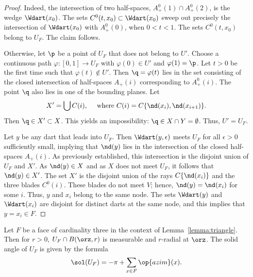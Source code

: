 \begin{proof} 
Indeed, the intersection of two half-spaces, $A^0_+(1)\cap
  A^0_+(2)$, is the wedge $\Wdart(x_0)$.  The sets
  $C^0(t,x_0)\subset\Wdart(x_0)$ sweep out precisely the intersection
  of $\Wdart(x_0)$ with $A^0_+(0)$, when $0<t<1$.  The sets
  $C^0(t,x_0)$ belong to $U_F$.  The claim follows.

   Otherwise, let
  $\p$ be a point of $U_F$ that does not belong to $U'$.  Choose a
  continuous path $\varphi:[0,1]\to U_F$ with $\varphi(0)\in U'$ and
  $\varphi(1)=\p$.  Let $t>0$ be the first time such that
  $\varphi(t)\not\in U'$.  Then $\q=\varphi(t)$ lies in the set
  consisting of the closed intersection of half-spaces $A_+(i)$
  corresponding to $A^0_+(i)$.  The point $\q$ also lies in one of the
  bounding planes.  Let
\begin{displaymath}
X' = \bigcup C(i),\quad\text{ where } C(i)=C\{\nd(x_i),\nd(x_{i+1})\}.
\end{displaymath}
Then $\q\in X'\subset X$.  This yields an impossibility:
$\q\in X\cap Y = \emptyset$.   Thus, $U'=U_F$.

Let $y$ be any dart that leads into $U_F$.  Then
$\Wdart(y,\epsilon)$ meets $U_F$ for all $\epsilon>0$ sufficiently
small, implying that $\nd(y)$ lies in the intersection of the
closed half-spaces $A_+(i)$.  As previously established, this
intersection is the disjoint union of $U_F$ and $X'$.  As $\nd(y)\in
X$ and as $X$ does not meet $U_F$, it follows that $\nd(y)\in X'$.  The set
$X'$ is the disjoint union of the rays $C\{\nd(x_i)\}$ and the three
blades $C^0(i)$.  These blades do not meet $V$; hence, $\nd(y)=\nd(x_i)$
for some $i$.  Thus, $y$ and $x_i$ belong to the same node.  The sets
$\Wdart(y)$ and $\Wdart( x_i)$ are disjoint for distinct darts at the
same node, and this implies that $y=x_i\in F$.
\end{proof}

\begin{corollary}\label{lemma:girard-component}
Let $F$ be a face of cardinality three in the context of
Lemma~\ref{lemma:triangle}.  Then for $r>0$, $U_F \cap B(\orz,r)$ is
measurable and $r$-radial at $\orz$.  The solid angle of $U_F$ is
given by the formula
\begin{displaymath}
\sol(U_F) = -\pi + \sum_{x\in F}\op{azim}(x).
\end{displaymath}
\end{corollary}
%
%
%

